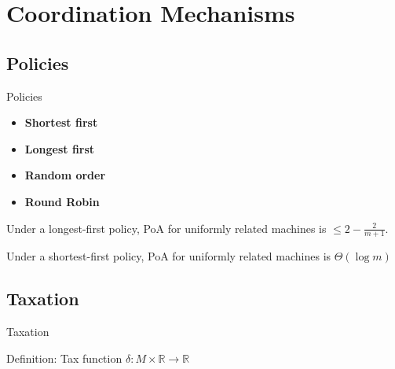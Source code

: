 \documentclass{beamer}
\newcommand{\R}{\mathbb{R}}
\begin{document}
\section{Coordination Mechanisms}
\subsection{Policies}
\begin{frame}{Policies}
\begin{itemize}
 \item \textbf{Shortest first}
  \item \textbf{Longest first}
  \item \textbf{Random order}
  \item \textbf{Round Robin}
 \end{itemize}
  \begin{theorem} Under a longest-first policy, PoA for uniformly related machines is $\leq 2 - \frac{2}{m+1}$.
\end{theorem}

\begin{theorem} Under a shortest-first policy, PoA for uniformly related machines is $\Theta(\log m)$
\end{theorem}
\end{frame}
\subsection{Taxation}
\begin{frame}{Taxation}
\begin{block}{Definition: Tax function}
$\delta: M \times \R \rightarrow \R$
\end{block}
\end{frame}
\end{document}
